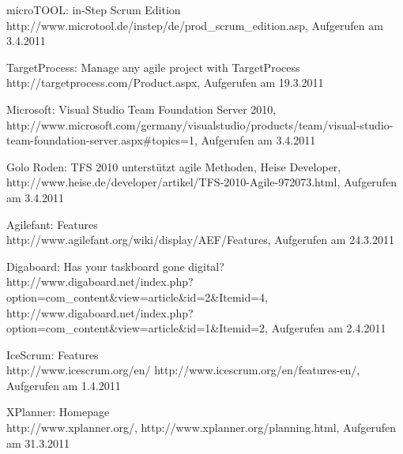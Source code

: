 \documentclass[german,english]{header}
\begin{document}
\begin{thebibliography}{5}
microTOOL:
in-Step Scrum Edition
http://www.microtool.de/instep/de/prod\_scrum\_edition.asp,
Aufgerufen am 3.4.2011

TargetProcess: Manage any agile project with TargetProcess\\
http://targetprocess.com/Product.aspx,
Aufgerufen am 19.3.2011

Microsoft:
Visual Studio Team Foundation Server 2010,
http://www.microsoft.com/germany/visualstudio/products/team/visual-studio-team-foundation-server.aspx\#topics=1,
Aufgerufen am 3.4.2011

Golo Roden: 
TFS 2010 unterstützt agile Methoden, Heise Developer,
http://www.heise.de/developer/artikel/TFS-2010-Agile-972073.html,
Aufgerufen am 3.4.2011

Agilefant: Features\\ 
http://www.agilefant.org/wiki/display/AEF/Features,
Aufgerufen am 24.3.2011

Digaboard: Has your taskboard gone digital?
http://www.digaboard.net/index.php?option=com\_content\&view=article\&id=2\&Itemid=4,
http://www.digaboard.net/index.php?option=com\_content\&view=article\&id=1\&Itemid=2,
Aufgerufen am 2.4.2011

IceScrum: Features\\
http://www.icescrum.org/en/
http://www.icescrum.org/en/features-en/,
Aufgerufen am 1.4.2011

XPlanner: Homepage\\
http://www.xplanner.org/,
http://www.xplanner.org/planning.html,
Aufgerufen am 31.3.2011

\end{thebibliography}
\end{document}
